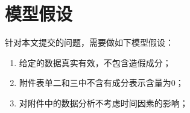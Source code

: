 \section{模型假设}
针对本文提交的问题，需要做如下模型假设：
\begin{enumerate}
	\item 给定的数据真实有效，不包含造假成分；
	\item 附件表单二和三中不含有成分表示含量为0；
	\item 对附件中的数据分析不考虑时间因素的影响；
\end{enumerate}